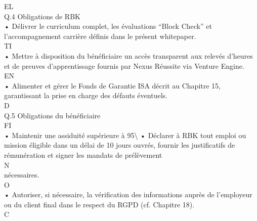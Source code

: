 \documentclass[12pt,landscape,a4paper]{article}
\begin{document}
\vspace{0.5em}
\vspace{0.5em}
\vspace{0.5em}
EL\\
Q.4 Obligations de RBK\\
• Délivrer le curriculum complet, les évaluations “Block Check” et l’accompagnement carrière définis dans le présent whitepaper.\\
\vspace{0.5em}
\vspace{0.5em}
\vspace{0.5em}
\vspace{0.5em}
TI\\
• Mettre à disposition du bénéficiaire un accès transparent aux relevés d’heures et de preuves d’apprentissage fournis par Nexus Réussite via Venture Engine.\\
\vspace{0.5em}
\vspace{0.5em}
\vspace{0.5em}
\vspace{0.5em}
EN\\
• Alimenter et gérer le Fonds de Garantie ISA décrit au Chapitre 15, garantissant la prise en charge des défauts éventuels.\\
\vspace{0.5em}
\vspace{0.5em}
\vspace{0.5em}
\vspace{0.5em}
D\\
Q.5 Obligations du bénéficiaire\\
\vspace{0.5em}
\vspace{0.5em}
FI\\
• Maintenir une assiduité supérieure à 95\textbackslash{}%
\vspace{0.5em}
• Déclarer à RBK tout emploi ou mission éligible dans un délai de 10 jours ouvrés, fournir les justificatifs de rémunération et signer les mandats de prélèvement\\
N\\
nécessaires.\\
O\\
• Autoriser, si nécessaire, la vérification des informations auprès de l’employeur ou du client final dans le respect du RGPD (cf. Chapitre 18).\\
C\\
\end{document}
